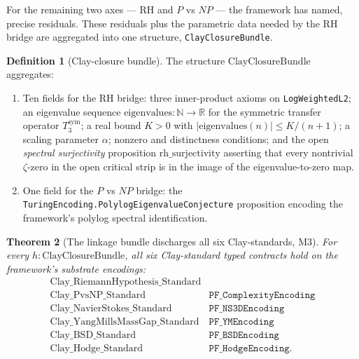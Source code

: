 \documentclass[11pt,a4paper]{article}
\theoremstyle{plain}
\newtheorem{theorem}{Theorem}[section]
\theoremstyle{definition}
\newtheorem{definition}[theorem]{Definition}
\begin{document}
For the remaining two axes --- RH and $P$ vs $NP$ --- the framework
has named, precise residuals. These residuals plus the parametric
data needed by the RH bridge are aggregated into one structure,
\texttt{ClayClosureBundle}.

\begin{definition}[Clay-closure bundle]
\label{def:bundle}
The structure $\mathrm{ClayClosureBundle}$ aggregates:
\begin{enumerate}[label=(\alph*),nosep]
\item Ten fields for the RH bridge: three inner-product axioms on
\texttt{LogWeightedL2}; an eigenvalue sequence
$\mathrm{eigenvalues} : \mathbb{N} \to \mathbb{R}$ for the symmetric
transfer operator $T_{3}^{\mathrm{sym}}$; a real bound $K > 0$ with
$|\mathrm{eigenvalues}(n)| \le K/(n+1)$; a scaling parameter
$\alpha$; nonzero and distinctness conditions; and the open
\emph{spectral surjectivity} proposition $\mathrm{rh\_surjectivity}$
asserting that every nontrivial $\zeta$-zero in the open critical
strip is in the image of the eigenvalue-to-zero map.
\item One field for the $P$ vs $NP$ bridge: the
\texttt{TuringEncoding.PolylogEigenvalueConjecture} proposition
encoding the framework's polylog spectral identification.
\end{enumerate}
\end{definition}

\begin{theorem}[The linkage bundle discharges all six Clay-standards, M3]
\label{thm:linkage}
For every $h : \mathrm{ClayClosureBundle}$, all six Clay-standard
typed contracts hold on the framework's substrate encodings:
\begin{align*}
\mathrm{Clay\_RiemannHypothesis\_Standard} \\
\mathrm{Clay\_PvsNP\_Standard}\,&\mathtt{PF\_ComplexityEncoding} \\
\mathrm{Clay\_NavierStokes\_Standard}\,&\mathtt{PF\_NS3DEncoding} \\
\mathrm{Clay\_YangMillsMassGap\_Standard}\,&\mathtt{PF\_YMEncoding} \\
\mathrm{Clay\_BSD\_Standard}\,&\mathtt{PF\_BSDEncoding} \\
\mathrm{Clay\_Hodge\_Standard}\,&\mathtt{PF\_HodgeEncoding}.
\end{align*}
\end{theorem}
\end{document}
